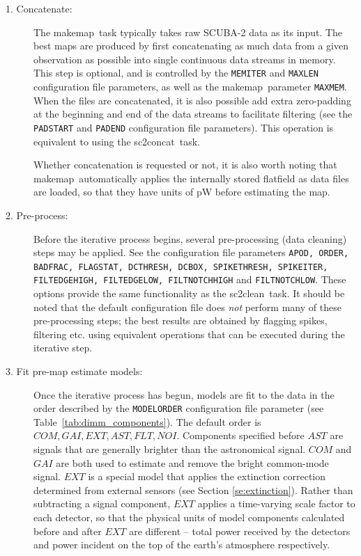 \documentclass[twoside,11pt]{article}
\newcommand{\xref}[3]{#1}
\renewcommand{\_}{\texttt{\symbol{95}}}
\newcommand{\task}[1]{\textsf{#1}}
\newcommand{\makemap}{\xref{\task{makemap}}{sun258}{MAKEMAP}}
\newcommand{\clean}{\xref{\task{sc2clean}}{sun258}{SC2CLEAN}}
\newcommand{\concat}{\xref{\task{sc2concat}}{sun258}{SC2CONCAT}}
\newcommand{\aparam}[1]{\texttt{#1}}     %
\newcommand{\cparam}[1]{\texttt{#1}}     %
\begin{document}
\begin{description}

\item[1. Concatenate:] The \makemap\ task typically takes raw SCUBA-2
  data as its input. The best maps are produced by first concatenating
  as much data from a given observation as possible into single
  continuous data streams in memory. This step is optional, and is
  controlled by the \cparam{MEMITER} and \cparam{MAXLEN} configuration
  file parameters, as well as the \makemap\ parameter
  \aparam{MAXMEM}. When the files are concatenated, it is also
  possible add extra zero-padding at the beginning and end of the data
  streams to facilitate filtering (see the \cparam{PADSTART} and
  \cparam{PADEND} configuration file parameters). This operation is
  equivalent to using the \concat\ task.

  Whether concatenation is requested or not, it is also worth noting
  that \makemap\ automatically applies the internally stored flatfield
  as data files are loaded, so that they have units of pW before
  estimating the map.

\item[2. Pre-process:] Before the iterative process begins, several
  pre-processing (data cleaning) steps may be applied. See the
  configuration file parameters \cparam{APOD, ORDER, BADFRAC,
    FLAGSTAT, DCTHRESH, DCBOX, SPIKETHRESH, SPIKEITER, FILT\_EDGEHIGH,
    FILT\_EDGELOW, FILT\_NOTCHHIGH} and \cparam{FILT\_NOTCHLOW}. These
  options provide the same functionality as the \clean\ task. It
  should be noted that the default configuration file does {\em not}
  perform many of these pre-processing steps; the best results are
  obtained by flagging spikes, filtering etc. using equivalent
  operations that can be executed during the iterative step.

\item[3. Fit pre-map estimate models:] Once the iterative process has
  begun, models are fit to the data in the order described by the
  \cparam{MODELORDER} configuration file parameter (see
  Table~\ref{tab:dimm_components}). The default order is $COM, GAI,
  EXT, AST, FLT, NOI$. Components specified before $AST$ are signals
  that are generally brighter than the astronomical signal. $COM$ and
  $GAI$ are both used to estimate and remove the bright common-mode
  signal. $EXT$ is a special model that applies the extinction
  correction determined from external sensors (see Section
  \ref{se:extinction}). Rather than subtracting a signal component,
  $EXT$ applies a time-varying scale factor to each detector, so that
  the physical units of model components calculated before and after
  $EXT$ are different -- total power received by the detectors and
  power incident on the top of the earth's atmosphere respectively.


\end{description}
\end{document}
